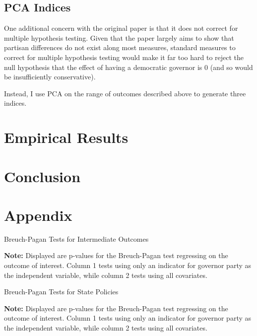 \documentclass{article}
\begin{document}
\subsection{PCA Indices}

One additional concern with the original paper is that it does not correct for multiple hypothesis testing. Given that the paper largely aims to show that partisan differences do not exist along most measures, standard measures to correct for multiple hypothesis testing would make it far too hard to reject the null hypothesis that the effect of having a democratic governor is 0 (and so would be insufficiently conservative). 

Instead, I use PCA on the range of outcomes described above to generate three indices. 

\section{Empirical Results}



\section{Conclusion}


\section{Appendix}


\begin{table}[!hbtp]
\caption{Breuch-Pagan Tests for Intermediate Outcomes}

\textbf{Note:} Displayed are p-values for the Breuch-Pagan test regressing on the outcome of interest. Column 1 tests using only an indicator for governor party as the independent variable, while column 2 tests using all covariates. 
\label{table:bp_outcome}
\end{table}

\begin{table}[!hbtp]
\caption{Breuch-Pagan Tests for State Policies}

\textbf{Note:} Displayed are p-values for the Breuch-Pagan test regressing on the outcome of interest. Column 1 tests using only an indicator for governor party as the independent variable, while column 2 tests using all covariates. 
\label{table:bp_policies}
\end{table}
\end{document}
